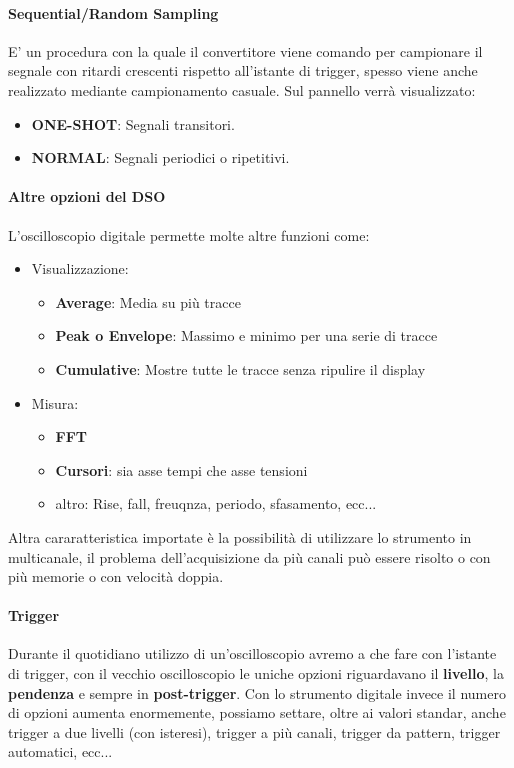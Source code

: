 \documentclass[12pt]{article}
\begin{document}
\paragraph{Sequential/Random Sampling} E' un procedura con la quale il convertitore viene comando per campionare il segnale con ritardi crescenti rispetto all'istante di trigger, spesso viene anche realizzato mediante campionamento casuale. Sul pannello verrà visualizzato:
\begin{itemize}
  \item \textbf{ONE-SHOT}: Segnali transitori.
  \item \textbf{NORMAL}: Segnali periodici o ripetitivi.
\end{itemize}

\paragraph{Altre opzioni del DSO} L'oscilloscopio digitale permette molte altre funzioni come:
\begin{itemize}
  \item Visualizzazione:
  \begin{itemize}
    \item \textbf{Average}: Media su più tracce
    \item \textbf{Peak o Envelope}: Massimo e minimo per una serie di tracce
    \item \textbf{Cumulative}: Mostre tutte le tracce senza ripulire il display
  \end{itemize}
  \item Misura:
  \begin{itemize}
    \item \textbf{FFT}
    \item \textbf{Cursori}: sia asse tempi che asse tensioni
    \item altro: Rise, fall, freuqnza, periodo, sfasamento, ecc...
  \end{itemize}
\end{itemize}

Altra cararatteristica importate è la possibilità di utilizzare lo strumento in multicanale, il problema dell'acquisizione da più canali può essere risolto o con più memorie o con velocità doppia.

\paragraph{Trigger} Durante il quotidiano utilizzo di un'oscilloscopio avremo a che fare con l'istante di trigger, con il vecchio oscilloscopio le uniche opzioni riguardavano il \textbf{livello}, la \textbf{pendenza} e sempre in \textbf{post-trigger}. Con lo strumento digitale invece il numero di opzioni aumenta enormemente, possiamo settare, oltre ai valori standar, anche trigger a due livelli (con isteresi), trigger a più canali, trigger da pattern, trigger automatici, ecc...
\end{document}
